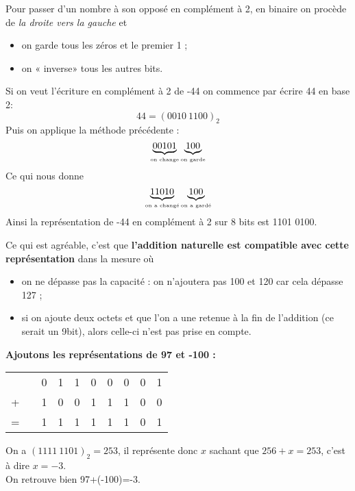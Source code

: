 \begin{methode}
    Pour passer d'un nombre à son opposé en complément à 2, en binaire on procède de \textit{la droite vers la gauche} et
    \begin{itemize}
        \item   on garde tous les zéros et le premier 1 ;
        \item   on « inverse»  tous les autres bits.
    \end{itemize}
\end{methode}

\begin{exemple}
    Si on veut l'écriture en complément à 2 de -44 on commence par écrire 44 en base 2:
    $$44=(0010\ 1100)_2$$
    Puis on applique la méthode précédente :
    $$\underbrace{00101}_{\textrm{\tiny on change}}\underbrace{100}_{\textrm{\tiny on garde}}$$
    Ce qui nous donne $$\underbrace{11010}_{\textrm{\tiny on a changé}}\underbrace{100}_{\textrm{\tiny on a gardé}}$$
    Ainsi la représentation de -44 en complément à 2 sur 8 bits est 1101 0100.
\end{exemple}
Ce qui est agréable, c'est que \textbf{l'addition naturelle est compatible avec cette représentation} dans la mesure où

\begin{itemize}
    \item   on ne dépasse pas la capacité : on n'ajoutera pas 100 et 120 car cela dépasse 127 ;
    \item   si on ajoute deux octets et que l'on a une retenue à la fin de l'addition (ce serait un 9\eme bit), alors
          celle-ci n'est pas prise en compte.
\end{itemize}

\begin{exemple}
    \textbf{Ajoutons les représentations de 97 et -100 :}
    \begin{center}

        \begin{tabular}{cccccccccc}
              &  & 0 & 1 & 1 & 0 & 0 & 0 & 0 & 1 \\

            + &  & 1 & 0 & 0 & 1 & 1 & 1 & 0 & 0 \\
            \hline
            = &  & 1 & 1 & 1 & 1 & 1 & 1 & 0 & 1 \\
        \end{tabular}
    \end{center}
    On a $(1111\ 1101)_2=253$, il représente donc $x$ sachant que $256+x=253$, c'est à dire $x=-3$.\\

    On retrouve bien 97+(-100)=-3.
\end{exemple}

